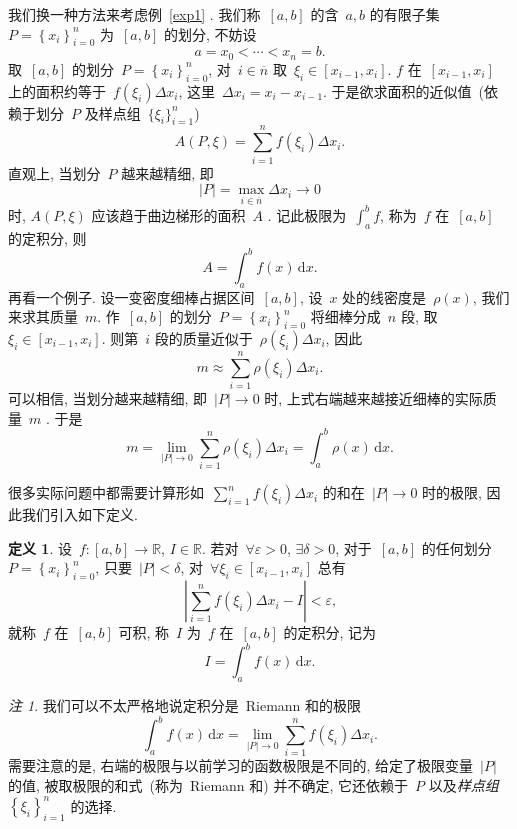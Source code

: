 \documentclass[12pt]{ctexbook}
\theoremstyle{definition}
\newtheorem{defn}[thm]{定义}
\theoremstyle{remark}
\newtheorem{rem}[thm]{注}
\begin{document}
我们换一种方法来考虑例~\ref{exp1}%
. 我们称~$\left[  a,b\right]  $ 的含~$a,b$
的有限子集~$P=\left\{  x_{i}\right\}  _{i=0}%
^{n}$ 为~$\left[  a,b\right]  $ 的划分,
不妨设\[
a=x_{0}<\cdots<x_{n}=b\text{.}%
\]
取~$\left[  a,b\right]  $ 的划分~$P=\left\{
x_{i}\right\}  _{i=0}^{n}$, 对~$i\in\overline{n}$ 取~$\xi_{i}%
\in\left[  x_{i-1},x_{i}\right]  $. $f$ 在~$\left[  x_{i-1}%
,x_{i}\right]  $
上的面积约等于~$f(\xi_{i})\Delta
x_{i}$, 这里~$\Delta x_{i}=x_{i}-x_{i-1}$.
于是欲求面积的近似值~(依赖于划分~$P$
及样点组~$\{\xi_{i}\}_{i=1}^{n}$)
\[
A(P,\xi)=\sum_{i=1}^{n}f(\xi_{i})\Delta x_{i}\text{.}%
\]
直观上, 当划分~$P$
越来越精细, 即\[
\left\vert P\right\vert =\max_{i\in\overline{n}}\Delta x_{i}\rightarrow0
\]
时, $A(P,\xi)$
应该趋于曲边梯形的面积~$A$
. 记此极限为~$\int_{a}^{b}f$,
称为~$f$ 在~$\left[  a,b\right]  $
的定积分, 则\[
A=\int_{a}^{b}f(x)\,\mathrm{d}x\text{.}%
\]
再看一个例子.
设一变密度细棒占据区间~$\left[
a,b\right]  $, 设~$x$
处的线密度是~$\rho(x)$,
我们来求其质量~$m$.
作~$\left[  a,b\right]  $ 的划分~$P=\left\{
x_{i}\right\}  _{i=0}^{n}$ 将细棒分成~$n$
段, 取~$\xi_{i}\in\left[  x_{i-1},x_{i}\right]  $.
则第~$i$
段的质量近似于~$\rho(\xi_{i})\Delta
x_{i}$, 因此\[
m\approx\sum_{i=1}^{n}\rho(\xi_{i})\Delta x_{i}\text{.}%
\]
可以相信,
当划分越来越精细,
即~$\left\vert P\right\vert \rightarrow0$ 时,
上式右端越来越接近细棒的实际质量~$m$%
. 于是\[
m=\lim_{\left\vert P\right\vert \rightarrow0}\sum_{i=1}^{n}\rho(\xi_{i})\Delta
x_{i}=\int_{a}^{b}\rho(x)\,\mathrm{d}x\text{.}%
\]


很多实际问题中都需要计算形如~${\textstyle\sum
\limits_{i=1}^{n}} f(\xi_{i})\Delta x_{i}$
的和在~$\left\vert P\right\vert \rightarrow0$
时的极限, 因此我们引入如下定义.

\begin{defn}
设~$f:\left[  a,b\right]  \rightarrow\mathbb{R}$, $I\in\mathbb{R}$.
若对~$\forall\varepsilon>0$, $\exists\delta>0$,
对于~$\left[  a,b\right]  $
的任何划分~$P=\left\{  x_{i}\right\}  _{i=0}%
^{n}$, 只要~$\left\vert P\right\vert <\delta$, 对~$\forall
\xi_{i}\in\left[  x_{i-1},x_{i}\right]  $ 总有\[
\left\vert \sum_{i=1}^{n}f(\xi_{i})\Delta x_{i}-I\right\vert <\varepsilon
\text{,}%
\]
就称~$f$ 在~$\left[  a,b\right]  $ 可积,
称~$I$ 为~$f$ 在~$\left[  a,b\right]  $
的定积分, 记为\[
I=\int_{a}^{b}f(x)\,\mathrm{d}x\text{.}%
\]

\end{defn}

\begin{rem}
我们可以不太严格地说定积分是~Riemann
和的极限\[
\int_{a}^{b}f(x)\,\mathrm{d}x=\lim_{\left\vert P\right\vert \rightarrow0}%
\sum_{i=1}^{n}f(\xi_{i})\Delta x_{i}\text{.}%
\]
需要注意的是,
右端的极限与以前学习的函数极限是不同的,
给定了极限变量~$\left\vert
P\right\vert $ 的值,
被取极限的和式~(称为~Riemann
和) 并不确定,
它还依赖于~$P$
以及\emph{样点组}~$\left\{  \xi_{i}\right\}
_{i=1}^{n}$ 的选择.
\end{rem}
\end{document}
